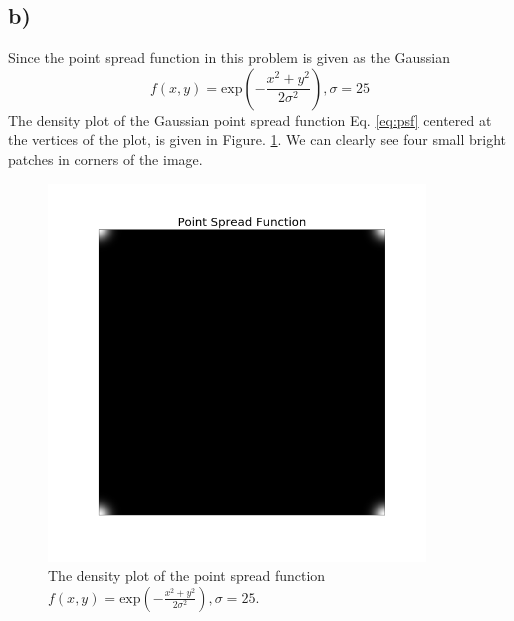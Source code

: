 \documentclass[12pt, graphicx]{article}
\begin{document}
\subsection*{b)}
Since the point spread function in this problem is given as the Gaussian
\begin{equation}
f(x,y)=\mathrm{exp}\left(-\frac{x^2+y^2}{2\sigma^2}\right),\sigma=25
\label{eq:psf}
\end{equation}
The density plot of the Gaussian point spread function Eq. \ref{eq:psf} centered at the vertices of the plot, is given in Figure. \ref{fig:psf}. We can clearly see four small bright patches in corners of the image. 

\begin{figure}[ht]
\centering
\includegraphics[width = 100mm]{point_spread.png}
\caption{The density plot of the point spread function $f(x,y)=\mathrm{exp}\left(-\frac{x^2+y^2}{2\sigma^2}\right),\sigma=25$.}
\label{fig:psf}
\end{figure}
\end{document}
